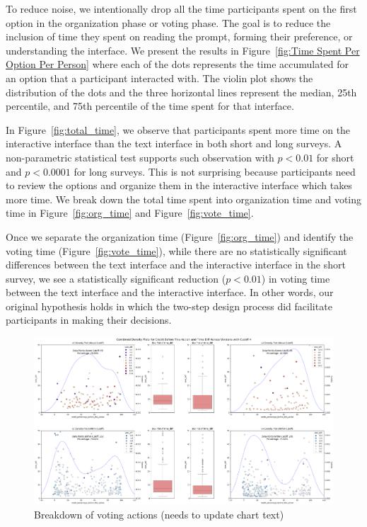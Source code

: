 To reduce noise, we intentionally drop all the time participants spent on the first option in the organization phase or voting phase. The goal is to reduce the inclusion of time they spent on reading the prompt, forming their preference, or understanding the interface. We present the results in Figure~\ref{fig:Time Spent Per Option Per Person} where each of the dots represents the time accumulated for an option that a participant interacted with. The violin plot shows the distribution of the dots and the three horizontal lines represent the median, 25th percentile, and 75th percentile of the time spent for that interface.

In Figure~\ref{fig:total_time}, we observe that participants spent more time on the interactive interface than the text interface in both short and long surveys. A non-parametric statistical test supports such observation with $p<0.01$ for short and $p<0.0001$ for long surveys. This is not surprising because participants need to review the options and organize them in the interactive interface which takes more time. We break down the total time spent into organization time and voting time in Figure~\ref{fig:org_time} and Figure~\ref{fig:vote_time}.

Once we separate the organization time (Figure~\ref{fig:org_time}) and identify the voting time (Figure~\ref{fig:vote_time}), while there are no statistically significant differences between the text interface and the interactive interface in the short survey, we see a statistically significant reduction ($p<0.01$) in voting time between the text interface and the interactive interface. In other words, our original hypothesis holds in which the two-step design process did facilitate participants in making their decisions.

\begin{figure}[h]
    \centering
    \includegraphics[width=\textwidth]{content/image/results/temp_cut4.png}
    \caption{Breakdown of voting actions (needs to update chart text)}
    \label{fig:voting_v3_v4}
\end{figure}

